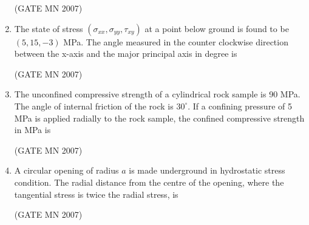 \documentclass[journal]{IEEEtran}
\begin{document}
\begin{enumerate}
\hfill (GATE MN 2007)


\item The state of stress $(\sigma_{xx}, \sigma_{yy}, \tau_{xy})$ at a point below ground is found to be $(5, 15, -3)$ MPa. The angle measured in the counter clockwise direction between the x-axis and the major principal axis in degree is
\begin{enumerate}
\end{enumerate}

\hfill (GATE MN 2007)

\item The unconfined compressive strength of a cylindrical rock sample is 90 MPa. The angle of internal friction of the rock is $30^\circ$. If a confining pressure of 5 MPa is applied radially to the rock sample, the confined compressive strength in MPa is
\begin{enumerate}
\end{enumerate}

\hfill (GATE MN 2007)


\item A circular opening of radius $a$ is made underground in hydrostatic stress condition. The radial distance from the centre of the opening, where the tangential stress is twice the radial stress, is

\begin{enumerate}
\end{enumerate}


\hfill (GATE MN 2007)


\end{enumerate}
\end{document}
